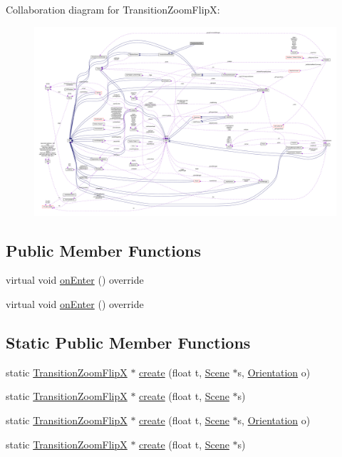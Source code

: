Collaboration diagram for Transition\+Zoom\+FlipX\+:
\nopagebreak
\begin{figure}[H]
\begin{center}
\leavevmode
\includegraphics[width=350pt]{classTransitionZoomFlipX__coll__graph}
\end{center}
\end{figure}
\subsection*{Public Member Functions}
\begin{DoxyCompactItemize}
\item 
virtual void \hyperlink{classTransitionZoomFlipX_a4a321886abfa6785e4a8b9e955791562}{on\+Enter} () override
\item 
virtual void \hyperlink{classTransitionZoomFlipX_a7f853a4b72233504d0947458408ac75c}{on\+Enter} () override
\end{DoxyCompactItemize}
\subsection*{Static Public Member Functions}
\begin{DoxyCompactItemize}
\item 
static \hyperlink{classTransitionZoomFlipX}{Transition\+Zoom\+FlipX} $\ast$ \hyperlink{classTransitionZoomFlipX_ac685ce10503f9fa92d719b2031984288}{create} (float t, \hyperlink{classScene}{Scene} $\ast$s, \hyperlink{classTransitionScene_a0b2b247806fb10a20de0cbc554210c4d}{Orientation} o)
\item 
static \hyperlink{classTransitionZoomFlipX}{Transition\+Zoom\+FlipX} $\ast$ \hyperlink{classTransitionZoomFlipX_a0bd981bed0aa184a2ec55c40f472b19b}{create} (float t, \hyperlink{classScene}{Scene} $\ast$s)
\item 
static \hyperlink{classTransitionZoomFlipX}{Transition\+Zoom\+FlipX} $\ast$ \hyperlink{classTransitionZoomFlipX_a8f9258850f3339dab03df40d849de289}{create} (float t, \hyperlink{classScene}{Scene} $\ast$s, \hyperlink{classTransitionScene_a0b2b247806fb10a20de0cbc554210c4d}{Orientation} o)
\item 
static \hyperlink{classTransitionZoomFlipX}{Transition\+Zoom\+FlipX} $\ast$ \hyperlink{classTransitionZoomFlipX_a2b24028b848f3c8e2a43eb3d02e1d628}{create} (float t, \hyperlink{classScene}{Scene} $\ast$s)
\end{DoxyCompactItemize}
